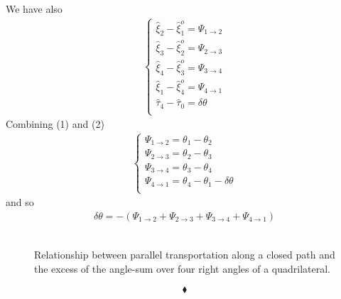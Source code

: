 We have also
\begin{align}
\left \{ \begin{array}{l}
\widehat{\xi}_{2}  - \widehat{\xi}^{o}_{1} = \Psi_{1 \rightarrow 2}\\
\widehat{\xi}_{3}  - \widehat{\xi}^{o}_{2} = \Psi_{2 \rightarrow 3}\\
\widehat{\xi}_{4}  - \widehat{\xi}^{o}_{3} = \Psi_{3 \rightarrow 4}\\
\widehat{\xi}_{1}  - \widehat{\xi}^{o}_{4} = \Psi_{4 \rightarrow 1}\\
\widehat{\tau}_{4}-\widehat{\tau}_{0} = \delta \theta\\ 
\end{array} \right.
\end{align}
Combining (1) and (2)
\begin{align}
\left \{ \begin{array}{l}
\Psi_{1 \rightarrow 2} = \theta_{1}-\theta_{2}\\
\Psi_{2 \rightarrow 3}= \theta_{2}-\theta_{3}\\
\Psi_{3 \rightarrow 4}= \theta_{3}-\theta_{4}\\
\Psi_{4 \rightarrow 1}= \theta_{4}-\theta_{1}- \delta \theta\\
\end{array} \right.
\end{align}
and so 
\begin{align}
\delta \theta = -(\Psi_{1 \rightarrow 2}+\Psi_{2 \rightarrow 3}+\Psi_{3 \rightarrow 4}+\Psi_{4 \rightarrow 1})
\end{align}\\
\begin{figure}[h]%
    \centering
    \subfloat[]{}
	\qquad
    \subfloat[]{}
\caption{Relationship between parallel transportation along a closed path and the excess of the angle-sum over four right angles of a quadrilateral.}
\end{figure}

$$\blacklozenge$$
\newpage